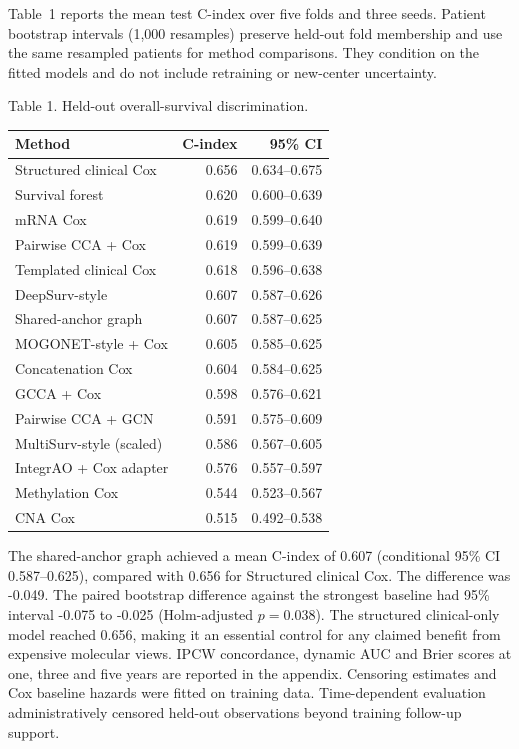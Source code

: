\documentclass{article}
\begin{document}
Table~1 reports the mean test C-index over five folds and three seeds.
Patient bootstrap intervals (1,000 resamples) preserve held-out fold membership
and use the same resampled patients for method comparisons. They condition on
the fitted models and do not include retraining or new-center uncertainty.
\begin{center}\small Table 1. Held-out overall-survival discrimination.\end{center}
\begin{center}
\footnotesize
\begin{tabular}{lrr}\hline
Method & C-index & 95\% CI\\\hline
Structured clinical Cox & 0.656 & 0.634--0.675\\
Survival forest & 0.620 & 0.600--0.639\\
mRNA Cox & 0.619 & 0.599--0.640\\
Pairwise CCA + Cox & 0.619 & 0.599--0.639\\
Templated clinical Cox & 0.618 & 0.596--0.638\\
DeepSurv-style & 0.607 & 0.587--0.626\\
Shared-anchor graph & 0.607 & 0.587--0.625\\
MOGONET-style + Cox & 0.605 & 0.585--0.625\\
Concatenation Cox & 0.604 & 0.584--0.625\\
GCCA + Cox & 0.598 & 0.576--0.621\\
Pairwise CCA + GCN & 0.591 & 0.575--0.609\\
MultiSurv-style (scaled) & 0.586 & 0.567--0.605\\
IntegrAO + Cox adapter & 0.576 & 0.557--0.597\\
Methylation Cox & 0.544 & 0.523--0.567\\
CNA Cox & 0.515 & 0.492--0.538\\
\hline\end{tabular}
\end{center}
The shared-anchor graph achieved a mean C-index of 0.607 (conditional 95\% CI 0.587--0.625), compared with 0.656 for Structured clinical Cox. The difference was -0.049. The paired bootstrap difference against the strongest baseline had 95\% interval -0.075 to -0.025 (Holm-adjusted $p=0.038$).
The structured clinical-only model reached 0.656, making it an
essential control for any claimed benefit from expensive molecular views.
IPCW concordance, dynamic AUC and Brier scores at one, three and five years
are reported in the appendix. Censoring estimates and Cox baseline hazards
were fitted on training data. Time-dependent evaluation administratively
censored held-out observations beyond training follow-up support.
\end{document}
